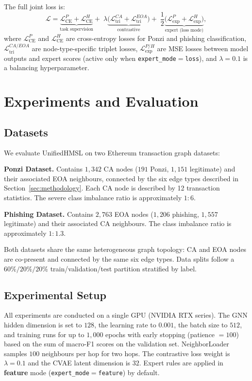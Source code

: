 \documentclass[conference]{IEEEtran}
\begin{document}
The full joint loss is:
\begin{equation}
  \mathcal{L}
  = \underbrace{
      \mathcal{L}_{\mathrm{CE}}^{P}
      + \mathcal{L}_{\mathrm{CE}}^{H}
    }_{\text{task supervision}}
  + \;\lambda\underbrace{
      \bigl(\mathcal{L}_{\mathrm{tri}}^{CA}
       + \mathcal{L}_{\mathrm{tri}}^{EOA}\bigr)
    }_{\text{contrastive}}
  + \;\frac{1}{2}\underbrace{
      \bigl(\mathcal{L}_{\mathrm{exp}}^{P}
       + \mathcal{L}_{\mathrm{exp}}^{H}\bigr)
    }_{\text{expert (loss mode)}},
  \label{eq:loss}
\end{equation}
where $\mathcal{L}_{\mathrm{CE}}^{P}$ and $\mathcal{L}_{\mathrm{CE}}^{H}$
are cross-entropy losses for Ponzi and phishing classification,
$\mathcal{L}_{\mathrm{tri}}^{CA/EOA}$ are node-type-specific triplet
losses, $\mathcal{L}_{\mathrm{exp}}^{P/H}$ are MSE losses between
model outputs and expert scores (active only when
\texttt{expert\_mode}$=$\texttt{loss}), and $\lambda=0.1$ is a
balancing hyperparameter.

\section{Experiments and Evaluation}
\label{sec:experiments}

\subsection{Datasets}
We evaluate UnifiedHMSL on two Ethereum transaction graph datasets:

\noindent\textbf{Ponzi Dataset.}
Contains $1{,}342$ CA nodes ($191$ Ponzi, $1{,}151$ legitimate)
and their associated EOA neighbours, connected by the six edge types
described in Section~\ref{sec:methodology}.
Each CA node is described by 12 transaction statistics.
The severe class imbalance ratio is approximately $1{:}6$.

\noindent\textbf{Phishing Dataset.}
Contains $2{,}763$ EOA nodes ($1{,}206$ phishing, $1{,}557$ legitimate)
and their associated CA neighbours.
The class imbalance ratio is approximately $1{:}1.3$.

Both datasets share the same heterogeneous graph topology: CA and EOA
nodes are co-present and connected by the same six edge types.
Data splits follow a $60\%/20\%/20\%$ train/validation/test partition
stratified by label.

\subsection{Experimental Setup}
All experiments are conducted on a single GPU (NVIDIA RTX series).
The GNN hidden dimension is set to $128$, the learning rate to
$0.001$, the batch size to $512$, and training runs for up to
$1{,}000$ epochs with early stopping (patience $= 100$) based on
the sum of macro-F1 scores on the validation set.
NeighborLoader samples $100$ neighbours per hop for two hops.
The contrastive loss weight is $\lambda = 0.1$ and the CVAE latent
dimension is $32$.  Expert rules are applied in \textbf{feature}
mode (\texttt{expert\_mode}$=$\texttt{feature}) by default.
\end{document}
